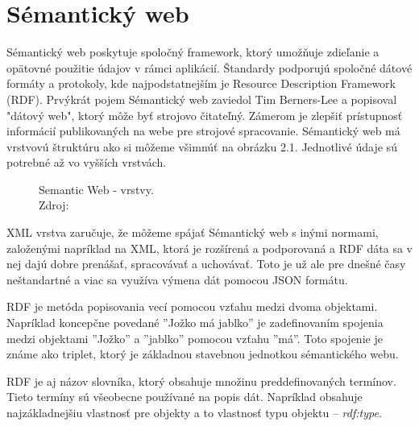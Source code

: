 \documentclass[12pt, a4paper, oneside]{book}
\begin{document}
\chapter{Sémantický web}
Sémantický web \cite{semantic} poskytuje spoločný framework, ktorý umožňuje zdieľanie a opätovné použitie údajov v rámci aplikácií. Štandardy podporujú spoločné dátové formáty a protokoly, kde najpodstatnejším je Resource Description Framework (RDF). Prvýkrát pojem Sémantický web zaviedol Tim Berners-Lee a popisoval "dátový web", ktorý môže byť strojovo čitateľný. Zámerom je zlepšiť prístupnosť informácií publikovaných na webe pre strojové spracovanie. Sémantický web má vrstvovú štruktúru ako si môžeme všimnúť na obrázku 2.1. Jednotlivé údaje sú potrebné až vo vyšších vrstvách. 

\begin{figure}
\label{fig:semantic_web}
\caption{Semantic Web - vrstvy.\\Zdroj: \cite{semanticweb}}

\end{figure}

XML vrstva zaručuje, že môžeme spájať Sémantický web s inými normami, založenými napríklad na XML, ktorá je rozšírená a podporovaná a RDF dáta sa v nej dajú dobre prenášať, spracovávať a uchovávať. Toto je už ale pre dnešné časy neštandartné a viac sa využíva výmena dát pomocou JSON formátu. 


RDF je metóda popisovania vecí pomocou vzťahu medzi dvoma objektami. Napríklad koncepčne povedané ''Jožko má jablko'' je zadefinovaním spojenia medzi objektami ''Jožko'' a ''jablko'' pomocou vzťahu ''má''.
Toto spojenie je známe ako triplet, ktorý je základnou stavebnou jednotkou sémantického webu. 


RDF je aj názov slovníka, ktorý obsahuje množinu preddefinovaných termínov. Tieto termíny sú všeobecne používané na popis dát. Napríklad obsahuje najzákladnejšiu vlastnosť pre objekty a to vlastnosť typu objektu -- \textit{rdf:type}. 
\end{document}
